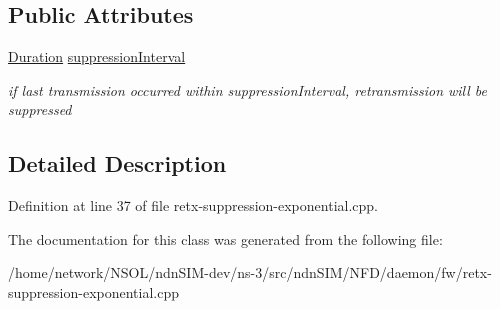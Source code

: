 \subsection*{Public Attributes}
\begin{DoxyCompactItemize}
\item 
\hyperlink{classnfd_1_1fw_1_1RetxSuppressionExponential_a8bf25d84d9b6756133a9c0822e0a4f7b}{Duration} \hyperlink{classnfd_1_1fw_1_1RetxSuppressionExponential_1_1PitInfo_a185ba88d6e79ed489a6dcbba7672c27b}{suppression\+Interval}\hypertarget{classnfd_1_1fw_1_1RetxSuppressionExponential_1_1PitInfo_a185ba88d6e79ed489a6dcbba7672c27b}{}\label{classnfd_1_1fw_1_1RetxSuppressionExponential_1_1PitInfo_a185ba88d6e79ed489a6dcbba7672c27b}

\begin{DoxyCompactList}\small\item\em if last transmission occurred within suppression\+Interval, retransmission will be suppressed \end{DoxyCompactList}\end{DoxyCompactItemize}


\subsection{Detailed Description}


Definition at line 37 of file retx-\/suppression-\/exponential.\+cpp.



The documentation for this class was generated from the following file\+:\begin{DoxyCompactItemize}
\item 
/home/network/\+N\+S\+O\+L/ndn\+S\+I\+M-\/dev/ns-\/3/src/ndn\+S\+I\+M/\+N\+F\+D/daemon/fw/retx-\/suppression-\/exponential.\+cpp\end{DoxyCompactItemize}
